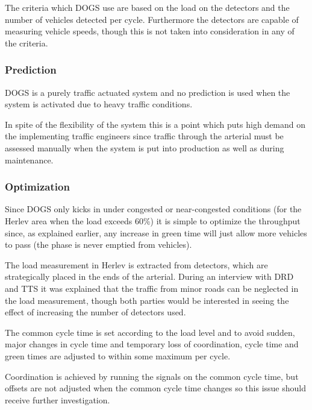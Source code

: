 The criteria which DOGS use are based on the load on the detectors and the number of vehicles detected per cycle. Furthermore the detectors are capable of measuring vehicle speeds, though this is not taken into consideration in any of the criteria.

\subsubsection*{Prediction}
DOGS is a purely traffic actuated system and no prediction is used when the system is activated due to heavy traffic conditions.

In spite of the flexibility of the system this is a point which puts high demand on the implementing traffic engineers since traffic through the arterial must be assessed manually when the system is put into production as well as during maintenance.

\subsubsection*{Optimization}
Since DOGS only kicks in under congested or near-congested conditions (for the Herlev area when the load exceeds 60\%) it is simple to optimize the throughput since, as explained earlier, any increase in green time will just allow more vehicles to pass (the phase is never emptied from vehicles).

The load measurement in Herlev is extracted from detectors, which are strategically placed in the ends of the arterial. During an interview with DRD and TTS it was explained that the traffic from minor roads can be neglected in the load measurement, though both parties would be interested in seeing the effect of increasing the number of detectors used.

The common cycle time is set according to the load level and to avoid sudden, major changes in cycle time and temporary loss of coordination, cycle time and green times are adjusted to within some maximum per cycle. 

Coordination is achieved by running the signals on the common cycle time, but offsets are not adjusted when the common cycle time changes so this issue should receive further investigation.